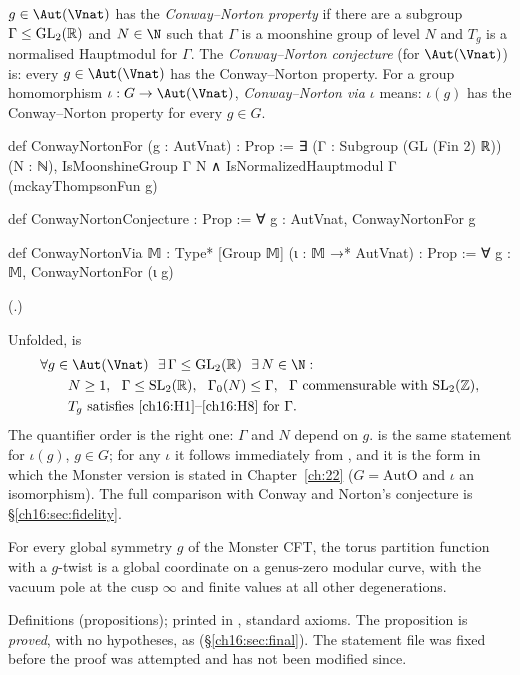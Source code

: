 \begin{definition}\label{ch16:def:cn}
$g\in\Aut(\Vnat)$ has the \emph{Conway--Norton property} if there are a subgroup $\Gamma\le\mathrm{GL}_2(\mathbb{R})$ and
$N\in\N$ such that $\Gamma$ is a moonshine group of level $N$ and $T_g$ is a normalised Hauptmodul for $\Gamma$.  The
\emph{Conway--Norton conjecture} (for $\Aut(\Vnat)$) is: every $g\in\Aut(\Vnat)$ has the Conway--Norton property.  For a
group homomorphism $\iota:G\to\Aut(\Vnat)$, \emph{Conway--Norton via $\iota$} means: $\iota(g)$ has the Conway--Norton
property for every $g\in G$.
\end{definition}
\begin{leancode}
def ConwayNortonFor (g : AutVnat) : Prop :=
  ∃ (Γ : Subgroup (GL (Fin 2) ℝ)) (N : ℕ), IsMoonshineGroup Γ N ∧
    IsNormalizedHauptmodul Γ (mckayThompsonFun g)

def ConwayNortonConjecture : Prop :=
  ∀ g : AutVnat, ConwayNortonFor g

def ConwayNortonVia {𝕄 : Type*} [Group 𝕄] (ι : 𝕄 →* AutVnat) : Prop :=
  ∀ g : 𝕄, ConwayNortonFor (ι g)
\end{leancode}
(.)
\begin{dictionary}
Unfolded,  is
\begin{align*}
  &\forall g\in\Aut(\Vnat)\ \ \exists\,\Gamma\le\chsixteenGLR\ \ \exists\,N\in\N:\\
  &\qquad N\ge1,\ \ \Gamma\le\chsixteenSLR,\ \ \Gamma_0(N)\le\Gamma,\ \ \Gamma\ \text{commensurable with}\ \chsixteenSL,\\
  &\qquad T_g\ \text{satisfies \ref{ch16:H1}--\ref{ch16:H8} for }\Gamma .
\end{align*}
The quantifier order is the right one: $\Gamma$ and $N$ depend on $g$.   is the same statement
for $\iota(g)$, $g\in G$; for any $\iota$ it follows immediately from , and it is the form
in which the Monster version is stated in Chapter~\ref{ch:22} ($G=\mathrm{AutO}$ and $\iota$ an isomorphism).  The
full comparison with Conway and Norton's conjecture is \S\ref{ch16:sec:fidelity}.
\end{dictionary}
\begin{physics}
For every global symmetry $g$ of the Monster CFT, the torus partition function with a $g$-twist is a global
coordinate on a genus-zero modular curve, with the vacuum pole at the cusp $\infty$ and finite values at all
other degenerations.
\end{physics}
\begin{status}
Definitions (propositions); printed in , standard axioms.  The
proposition  is \emph{proved}, with no hypotheses, as 
(\S\ref{ch16:sec:final}).  The statement file was fixed before the proof was attempted and has not been modified since.
\end{status}

